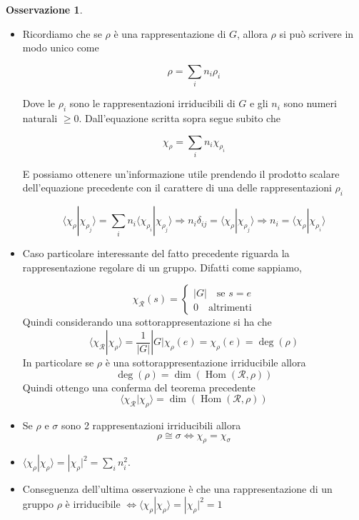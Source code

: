 \documentclass[11pt]{article}
\theoremstyle{plain}
\theoremstyle{definition}
\newtheorem*{rem}{Osservazione}
\theoremstyle{remark}
\newcommand{\dsum}{\displaystyle\sum}
\DeclareMathOperator{\Hom}{Hom}
\begin{document}
\begin{rem}

  \begin{itemize}
  \item Ricordiamo che se $\rho$ è una rappresentazione di $G$, allora $\rho$ si può scrivere in modo unico come 
  
    \[ \rho = \dsum_i n_i \rho_i\]

    Dove le $\rho_i$ sono le rappresentazioni irriducibili di $G$ e gli $n_i$ sono numeri naturali $\geq 0$. Dall'equazione scritta sopra segue subito che
    
    \[ \chi_\rho = \dsum_i n_i \chi_{\rho_i}\]

    E possiamo ottenere un'informazione utile prendendo il prodotto scalare dell'equazione precedente con il carattere di una delle rappresentazioni $\rho_i$
    
    \[ \langle \chi_\rho | \chi_{\rho_j} \rangle = \dsum_i n_i \langle \chi_{\rho_i} | \chi_{\rho_j} \rangle \Rightarrow n_i \delta_{ij} = \langle \chi_\rho | \chi_{\rho_j} \rangle \Rightarrow n_i = \langle \chi_\rho | \chi_{\rho_i} \rangle\]

  \item Caso particolare interessante del fatto precedente riguarda la rappresentazione regolare di un gruppo. Difatti come sappiamo,
    
    \[ \chi_{\mathcal{R}}(s) = 
    \begin{cases}
      |G| \quad \text{se } s = e \\
      0 \quad \text{altrimenti}
    \end{cases}\]
    Quindi considerando una sottorappresentazione  si ha che 
    \[
    \langle \chi_{\mathcal{R}} | \chi_\rho \rangle = \frac{1}{|G|}|G|\chi_{\rho}(e)=\chi_{\rho}(e)=\deg(\rho)
    \]
    In particolare se $\rho$ è una sottorappresentazione irriducibile allora
    \[ \deg(\rho)=\dim(\Hom(\mathcal{R},\rho)) \]
    Quindi ottengo una conferma del teorema precedente 
    \[      
    \langle \chi_{\mathcal{R}} | \chi_\rho \rangle =\dim(\Hom(\mathcal{R},\rho))
    \]
    
  \item Se $\rho$ e $\sigma$ sono 2 rappresentazioni irriducibili allora $$\rho \cong \sigma \Leftrightarrow \chi_{\rho}=\chi_{\sigma}$$
    
  \item $\langle \chi_\rho | \chi_\rho \rangle = |\chi_\rho|^2 = \sum_i n_i^2$.
  \item Conseguenza dell'ultima osservazione è che una rappresentazione di un gruppo $\rho$ è irriducibile $\Leftrightarrow \langle \chi_\rho | \chi_\rho \rangle = |\chi_\rho|^2 = 1$ 
    
    
  \end{itemize}

\end{rem}
\end{document}
